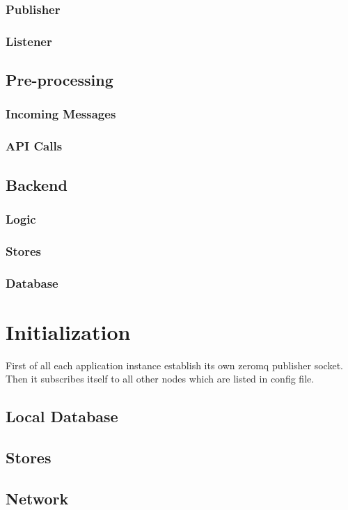 \subsubsection{Publisher}
\subsubsection{Listener}
\subsection{Pre-processing}
\subsubsection{Incoming Messages}
\subsubsection{API Calls}
\subsection{Backend}
\subsubsection{Logic}
\subsubsection{Stores}
\subsubsection{Database}

\section{Initialization}
First of all each application instance establish its own zeromq publisher socket. Then it subscribes
itself to all other nodes which are listed in config file.
\subsection{Local Database}
\subsection{Stores}
\subsection{Network}

